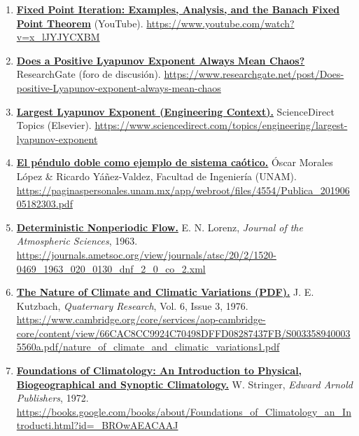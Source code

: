 \documentclass[
  10pt,
  a4paper,
  DIV=11,
  numbers=noendperiod,
  open=any]{scrreprt}
\numberwithin{equation}{chapter}
\numberwithin{equation}{section}
\renewcommand{\[}{\begin{equation}}
\renewcommand{\]}{\end{equation}}
\begin{document}
\begin{enumerate}
  \item \label{ref:web33}\href{https://www.youtube.com/watch?v=x_lJYJYCXBM}{\textbf{Fixed Point Iteration: Examples, Analysis, and the Banach Fixed Point Theorem}} (YouTube).  
  \url{https://www.youtube.com/watch?v=x_lJYJYCXBM}


  \item \label{ref:web34}\href{https://www.researchgate.net/post/Does-positive-Lyapunov-exponent-always-mean-chaos}{\textbf{Does a Positive Lyapunov Exponent Always Mean Chaos?}} ResearchGate (foro de discusión).  
\url{https://www.researchgate.net/post/Does-positive-Lyapunov-exponent-always-mean-chaos}

\item \label{ref:web35}\href{https://www.sciencedirect.com/topics/engineering/largest-lyapunov-exponent}{\textbf{Largest Lyapunov Exponent (Engineering Context).}} ScienceDirect Topics (Elsevier).  
\url{https://www.sciencedirect.com/topics/engineering/largest-lyapunov-exponent}

\item \label{ref:web36}\href{https://paginaspersonales.unam.mx/app/webroot/files/4554/Publica_20190605182303.pdf}{\textbf{El péndulo doble como ejemplo de sistema caótico.}} Óscar Morales López & Ricardo Yáñez-Valdez, Facultad de Ingeniería (UNAM).  
\url{https://paginaspersonales.unam.mx/app/webroot/files/4554/Publica_20190605182303.pdf}

\item \label{ref:web37}\href{https://journals.ametsoc.org/view/journals/atsc/20/2/1520-0469_1963_020_0130_dnf_2_0_co_2.xml}{\textbf{Deterministic Nonperiodic Flow.}} E. N. Lorenz, \textit{Journal of the Atmospheric Sciences}, 1963.  
\url{https://journals.ametsoc.org/view/journals/atsc/20/2/1520-0469_1963_020_0130_dnf_2_0_co_2.xml}



\item \label{ref:web40}\href{https://www.cambridge.org/core/services/aop-cambridge-core/content/view/66CAC8CC9924C70498DFFD08287437FB/S0033589400035560a.pdf/nature_of_climate_and_climatic_variations1.pdf}{\textbf{The Nature of Climate and Climatic Variations (PDF).}} J. E. Kutzbach, \textit{Quaternary Research}, Vol. 6, Issue 3, 1976.  
\url{https://www.cambridge.org/core/services/aop-cambridge-core/content/view/66CAC8CC9924C70498DFFD08287437FB/S0033589400035560a.pdf/nature_of_climate_and_climatic_variations1.pdf}

\item \label{ref:web41}\href{https://books.google.com/books/about/Foundations_of_Climatology_an_Introducti.html?id=_BROwAEACAAJ}{\textbf{Foundations of Climatology: An Introduction to Physical, Biogeographical and Synoptic Climatology.}} W. Stringer, \textit{Edward Arnold Publishers}, 1972.  
\url{https://books.google.com/books/about/Foundations_of_Climatology_an_Introducti.html?id=_BROwAEACAAJ}


\end{enumerate}
\end{document}
